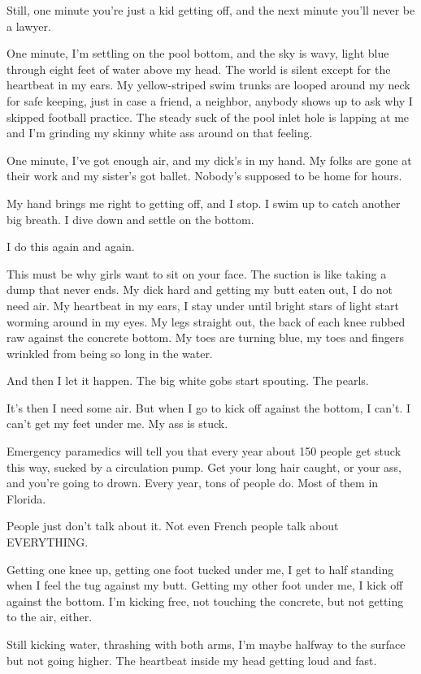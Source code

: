 \documentclass[10pt,a5paper,twoside]{book}
\begin{document}
Still, one minute you're just a kid getting off, and the next minute you'll never be a lawyer.

One minute, I'm settling on the pool bottom, and the sky is wavy, light blue through eight feet of water above my head. The world is silent except for the heartbeat in my ears. My yellow-striped swim trunks are looped around my neck for safe keeping, just in case a friend, a neighbor, anybody shows up to ask why I skipped football practice. The steady suck of the pool inlet hole is lapping at me and I'm grinding my skinny white ass around on that feeling.

One minute, I've got enough air, and my dick's in my hand. My folks are gone at their work and my sister's got ballet. Nobody's supposed to be home for hours.

My hand brings me right to getting off, and I stop. I swim up to catch another big breath. I dive down and settle on the bottom.

I do this again and again.

This must be why girls want to sit on your face. The suction is like taking a dump that never ends. My dick hard and getting my butt eaten out, I do not need air. My heartbeat in my ears, I stay under until bright stars of light start worming around in my eyes. My legs straight out, the back of each knee rubbed raw against the concrete bottom. My toes are turning blue, my toes and fingers wrinkled from being so long in the water.

And then I let it happen. The big white gobs start spouting. The pearls.

It's then I need some air. But when I go to kick off against the bottom, I can't. I can't get my feet under me. My ass is stuck.

Emergency paramedics will tell you that every year about 150 people get stuck this way, sucked by a circulation pump. Get your long hair caught, or your ass, and you're going to drown. Every year, tons of people do. Most of them in Florida.

People just don't talk about it. Not even French people talk about EVERYTHING.

Getting one knee up, getting one foot tucked under me, I get to half standing when I feel the tug against my butt. Getting my other foot under me, I kick off against the bottom. I'm kicking free, not touching the concrete, but not getting to the air, either.

Still kicking water, thrashing with both arms, I'm maybe halfway to the surface but not going higher. The heartbeat inside my head getting loud and fast.
\end{document}
